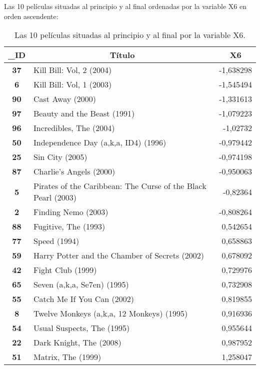 \documentclass{uimppracticas}
\begin{document}
Las 10 películas situadas al principio y al final ordenadas por la variable X6 en orden ascendente:

\begin{table}[h]
	\centering
	\begin{tabular}{|c|l|r|}
		\hline
		\textbf{\_ID} & \multicolumn{1}{c|}{\textbf{Título}}                          & \multicolumn{1}{c|}{\textbf{X6}} \\ \hline
		\textbf{37} & Kill Bill: Vol, 2 (2004)    & -1,638298 \\ \hline
		\textbf{6}  & Kill Bill: Vol, 1 (2003)    & -1,545494 \\ \hline
		\textbf{90} & Cast Away (2000)            & -1,331613 \\ \hline
		\textbf{97} & Beauty and the Beast (1991) & -1,079223 \\ \hline
		\textbf{96} & Incredibles, The (2004)     & -1,02732  \\ \hline
		\textbf{50}   & Independence Day (a,k,a, ID4) (1996)                          & -0,979442                        \\ \hline
		\textbf{25} & Sin City (2005)             & -0,974198 \\ \hline
		\textbf{87} & Charlie's Angels (2000)     & -0,950063 \\ \hline
		\textbf{5}    & Pirates of the Caribbean: The Curse of the Black Pearl (2003) & -0,82364                         \\ \hline
		\textbf{2}  & Finding Nemo (2003)         & -0,808264 \\ \hline
		\hline
		\textbf{88} & Fugitive, The (1993)        & 0,542654 \\ \hline
		\textbf{77} & Speed (1994)                & 0,658863 \\ \hline
		\textbf{59}   & Harry Potter and the Chamber of Secrets (2002) & 0,678092                         \\ \hline
		\textbf{42} & Fight Club (1999)           & 0,729976 \\ \hline
		\textbf{65} & Seven (a,k,a, Se7en) (1995) & 0,732908 \\ \hline
		\textbf{55} & Catch Me If You Can (2002)  & 0,819855 \\ \hline
		\textbf{8}    & Twelve Monkeys (a,k,a, 12 Monkeys) (1995)      & 0,916936                         \\ \hline
		\textbf{54} & Usual Suspects, The (1995)  & 0,955644 \\ \hline
		\textbf{22} & Dark Knight, The (2008)     & 0,987952 \\ \hline
		\textbf{51} & Matrix, The (1999)          & 1,258047 \\ \hline
	\end{tabular}
	\caption{Las 10 películas situadas al principio y al final por la variable X6.}
	\label{X6_principio}
\end{table}
\end{document}
